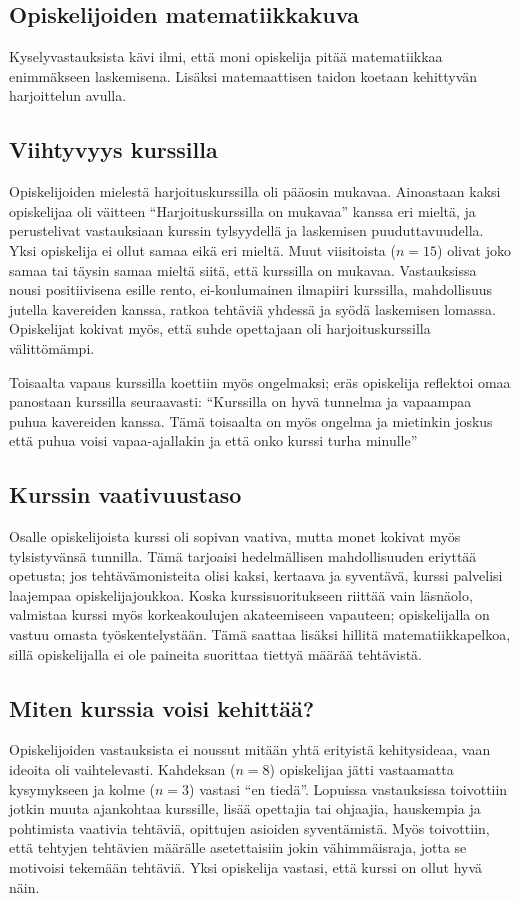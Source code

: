 \subsection{Opiskelijoiden matematiikkakuva}
Kyselyvastauksista kävi ilmi, että moni opiskelija pitää matematiikkaa enimmäkseen laskemisena.
Lisäksi matemaattisen taidon koetaan kehittyvän harjoittelun avulla.

\subsection{Viihtyvyys kurssilla}
Opiskelijoiden mielestä harjoituskurssilla oli pääosin mukavaa. Ainoastaan kaksi opiskelijaa oli väitteen ``Harjoituskurssilla on mukavaa'' kanssa eri mieltä, ja perustelivat vastauksiaan kurssin tylsyydellä ja laskemisen puuduttavuudella. Yksi opiskelija ei ollut samaa eikä eri mieltä. Muut viisitoista ($n=15$) olivat joko samaa tai täysin samaa mieltä siitä, että kurssilla on mukavaa. Vastauksissa nousi positiivisena esille rento, ei-koulumainen ilmapiiri kurssilla, mahdollisuus jutella kavereiden kanssa, ratkoa tehtäviä yhdessä ja syödä laskemisen lomassa. Opiskelijat kokivat myös, että suhde opettajaan oli harjoituskurssilla välittömämpi. 

Toisaalta vapaus kurssilla koettiin myös ongelmaksi; eräs opiskelija reflektoi omaa panostaan kurssilla seuraavasti: ``Kurssilla on hyvä tunnelma ja vapaampaa puhua kavereiden kanssa. Tämä toisaalta on myös ongelma ja mietinkin joskus että puhua voisi vapaa-ajallakin ja että onko kurssi turha minulle''



\subsection{Kurssin vaativuustaso}
Osalle opiskelijoista kurssi oli sopivan vaativa, mutta monet kokivat myös tylsistyvänsä tunnilla.
Tämä tarjoaisi hedelmällisen mahdollisuuden eriyttää opetusta; jos tehtävämonisteita olisi kaksi, kertaava ja syventävä, kurssi palvelisi laajempaa opiskelijajoukkoa.
Koska kurssisuoritukseen riittää vain läsnäolo, valmistaa kurssi myös korkeakoulujen akateemiseen vapauteen; opiskelijalla on vastuu omasta työskentelystään.
Tämä saattaa lisäksi hillitä matematiikkapelkoa, sillä opiskelijalla ei ole paineita suorittaa tiettyä määrää tehtävistä.

\subsection{Miten kurssia voisi kehittää?}
Opiskelijoiden vastauksista ei noussut mitään yhtä erityistä kehitysideaa, vaan ideoita oli vaihtelevasti. Kahdeksan ($n=8$) opiskelijaa jätti vastaamatta kysymykseen ja kolme ($n=3$) vastasi ``en tiedä''. Lopuissa vastauksissa toivottiin jotkin muuta ajankohtaa kurssille, lisää opettajia tai ohjaajia, hauskempia ja pohtimista vaativia tehtäviä, opittujen asioiden syventämistä. Myös toivottiin, että tehtyjen tehtävien määrälle asetettaisiin jokin vähimmäisraja, jotta se motivoisi tekemään tehtäviä. Yksi opiskelija vastasi, että kurssi on ollut hyvä näin. 



